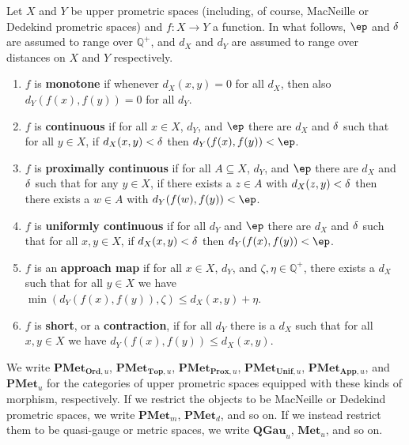 \documentclass{article}
\def\Qp{\mathbb{Q}^+}
\def\PMet{\mathbf{PMet}}
\def\QGau{\mathbf{QGau}}
\def\Met{\mathbf{Met}}
\def\PMetu{\mathbf{PMet}_u}
\def\PMetTopu{\mathbf{PMet}_{\mathbf{Top},u}}
\def\PMetUnifu{\mathbf{PMet}_{\mathbf{Unif},u}}
\def\PMetProxu{\mathbf{PMet}_{\mathbf{Prox},u}}
\def\PMetAppu{\mathbf{PMet}_{\mathbf{App},u}}
\def\PMetOrdu{\mathbf{PMet}_{\mathbf{Ord},u}}
\begin{document}
\begin{defn}\label{def:pmet-maps}
  Let $X$ and $Y$ be upper prometric spaces (including, of course, MacNeille or Dedekind prometric spaces) and $f:X\to Y$ a function.
  In what follows, $\ep$ and $\delta$ are assumed to range over $\Qp$, and $d_X$ and $d_Y$ are assumed to range over distances on $X$ and $Y$ respectively.
  \begin{enumerate}
  \item $f$ is \textbf{monotone} if whenever $d_X(x,y)=0$ for all $d_X$, then also $d_Y(f(x),f(y))=0$ for all $d_Y$.
  \item $f$ is \textbf{continuous} if for all $x\in X$, $d_Y$, and $\ep$ there are $d_X$ and $\delta$ such that for all $y\in X$, if $d_X(x,y)<\delta$ then $d_Y(f(x),f(y))<\ep$.
  \item $f$ is \textbf{proximally continuous} if for all $A\subseteq X$, $d_Y$, and $\ep$ there are $d_X$ and $\delta$ such that for any $y\in X$, if there exists a $z\in A$ with $d_X(z,y)<\delta$ then there exists a $w\in A$ with $d_Y(f(w),f(y))<\ep$.
  \item $f$ is \textbf{uniformly continuous} if for all $d_Y$ and $\ep$ there are $d_X$ and $\delta$ such that for all $x,y\in X$, if $d_X(x,y)<\delta$ then $d_Y(f(x),f(y))<\ep$.
  \item $f$ is an \textbf{approach map} if for all $x\in X$, $d_Y$, and $\zeta,\eta\in \Qp$, there exists a $d_X$ such that for all $y\in X$ we have $\min(d_Y(f(x),f(y)),\zeta) \le d_X(x,y) +\eta$.
  \item $f$ is \textbf{short}, or a \textbf{contraction}, if for all $d_Y$ there is a $d_X$ such that for all $x,y\in X$ we have $d_Y(f(x),f(y)) \le d_X(x,y)$.
  \end{enumerate}
  We write $\PMetOrdu$, $\PMetTopu$, $\PMetProxu$, $\PMetUnifu$, $\PMetAppu$, and $\PMetu$ for the categories of upper prometric spaces equipped with these kinds of morphism, respectively.
  If we restrict the objects to be MacNeille or Dedekind prometric spaces, we write $\PMet_m$, $\PMet_d$, and so on.
  If we instead restrict them to be quasi-gauge or metric spaces, we write $\QGau_u$, $\Met_u$, and so on.
\end{defn}
\end{document}
